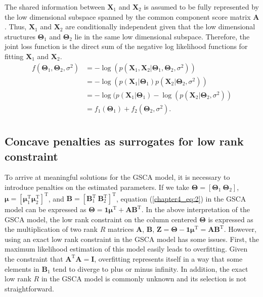 The shared information between $\mathbf{X}_1$ and $\mathbf{X}_2$ is assumed to be fully represented by the low dimensional subspace spanned by the common component score matrix $\mathbf{A}$. Thus, $\mathbf{X}_1$ and $\mathbf{X}_2$ are conditionally independent given that the low dimensional structures $\mathbf{\Theta}_1$ and $\mathbf{\Theta}_2$ lie in the same low dimensional subspace. Therefore, the joint loss function is the direct sum of the negative log likelihood functions for fitting $\mathbf{X}_1$ and $\mathbf{X}_2$.
\begin{equation}\label{chapter4_eq:4}
\begin{aligned}
f(\mathbf{\Theta}_1,\mathbf{\Theta}_2,\sigma^2) &= -\log(p(\mathbf{X}_1,\mathbf{X}_2|\mathbf{\Theta}_1,\mathbf{\Theta}_2,\sigma^2))\\
& = -\log(p(\mathbf{X}_1|\mathbf{\Theta}_1) p(\mathbf{X}_2|\mathbf{\Theta}_2,\sigma^2))\\
              &= -\log(p(\mathbf{X}_1|\mathbf{\Theta}_1)-\log(p(\mathbf{X}_2|\mathbf{\Theta}_2,\sigma^2))\\
              &= f_1(\mathbf{\Theta}_1) + f_2(\mathbf{\Theta}_2,\sigma^2).\\
\end{aligned}
\end{equation}

\subsection{Concave penalties as surrogates for low rank constraint}
To arrive at meaningful solutions for the GSCA model, it is necessary to introduce penalties on the estimated parameters. If we take $\mathbf{\Theta} = [\mathbf{\Theta}_1 ~ \mathbf{\Theta}_2]$, $\bm{\mu} = [\bm{\mu}_1^{\text{T}} \bm{\mu}_2^{\text{T}}]^{\text{T}}$, and $\mathbf{B} = [\mathbf{B}_1^{\text{T}} ~ \mathbf{B}_2^{\text{T}}]^{\text{T}}$, equation (\ref{chapter4_eq:2}) in the GSCA model can be expressed as $\mathbf{\Theta} = \mathbf{1}\bm{\mu}^{\text{T}} + \mathbf{AB}^{\text{T}}$. In the above interpretation of the GSCA model, the low rank constraint on the column centered $\mathbf{\Theta}$ is expressed as the multiplication of two rank $R$ matrices $\mathbf{A}$, $\mathbf{B}$, $\mathbf{Z} = \mathbf{\Theta} - \mathbf{1}\bm{\mu}^{\text{T}} = \mathbf{AB}^{\text{T}}$. However, using an exact low rank constraint in the GSCA model has some issues. First, the maximum likelihood estimation of this model easily leads to overfitting. Given the constraint that $\mathbf{A}^{\text{T}}\mathbf{A}=\mathbf{I}$, overfitting represents itself in a way that some elements in $\mathbf{B}_1$ tend to diverge to plus or minus infinity. In addition, the exact low rank $R$ in the GSCA model is commonly unknown and its selection is not straightforward.

